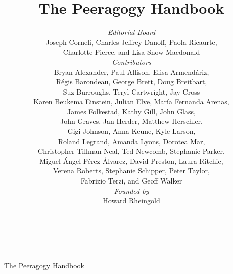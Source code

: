 \documentclass[ebook,12pt, twoside]{memoir}
\begin{document}
%
\sloppy \pagestyle{empty} \thispagestyle{empty}
\begin{center}
\quad\\[1in] 
{\LARGE The Peeragogy Handbook}
\end{center}
\clearpage\mbox{}\clearpage    %
\title{The Peeragogy Handbook\\[.5in]}
\author{

\emph{Editorial Board}\\
{\small Joseph Corneli, Charles Jeffrey Danoff, Paola Ricaurte,}\\
{\small Charlotte Pierce, and Lisa Snow Macdonald} \\[.25in]

\emph{Contributors} \\
{\small Bryan Alexander, Paul Allison, Elisa Armend\'ariz,} \\
{\small R\'egis Barondeau, George Brett, Doug Breitbart,}\\ 
{\small Suz Burroughs, Teryl Cartwright, Jay Cross}\\
{\small Karen Beukema Einstein, Julian Elve, Mar\'ia Fernanda Arenas,}\\
{\small James Folkestad, Kathy Gill, John Glass,} \\
{\small John Graves, Jan Herder, Matthew Herschler,} \\
{\small Gigi Johnson, Anna Keune, Kyle Larson,} \\
{\small Roland Legrand, Amanda Lyons, Dorotea Mar,} \\
{\small Christopher Tillman Neal, Ted Newcomb, Stephanie Parker,} \\
{\small Miguel \'Angel P\'erez \'Alvarez, David Preston, Laura Ritchie,} \\
{\small Verena Roberts, Stephanie Schipper, Peter Taylor,}\\
{\small Fabrizio Terzi, and Geoff Walker}\\[.25in]

\emph{Founded by}\\
{\small Howard Rheingold}\\[.25in]
}

\date{~}
\maketitle
\thispagestyle{empty}
\end{document}
